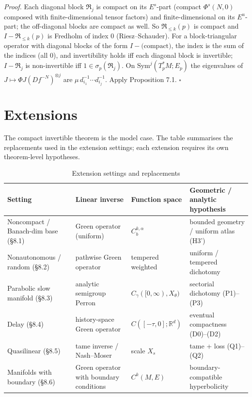 \documentclass[11pt,a4paper]{article}
\theoremstyle{plain}
\theoremstyle{definition}
\theoremstyle{remark}
\numberwithin{equation}{section}
\numberwithin{figure}{section}
\begin{document}
\textit{Proof.} Each diagonal block $\mathfrak R_j$ is compact on its $E^s$-part (compact $\Phi^s(N,0)$ composed with finite-dimensional tensor factors) and finite-dimensional on its $E^u$-part; the off-diagonal blocks are compact as well. So $\mathfrak R_{\le k}(p)$ is compact and $I-\mathfrak R_{\le k}(p)$ is Fredholm of index $0$ (Riesz–Schauder). For a block-triangular operator with diagonal blocks of the form $I-\text{(compact)}$, the index is the sum of the indices (all $0$), and invertibility holds iff each diagonal block is invertible; $I-\mathfrak R_j$ is non-invertible iff $1\in\sigma_p(\mathfrak R_j)$. On $\mathrm{Sym}^j(T^*_pM;E_p)$ the eigenvalues of $J\mapsto\Phi J(Df^{-N})^{\otimes j}$ are $\mu\,d_{i_1}^{-1}\cdots d_{i_j}^{-1}$. Apply Proposition 7.1. $\square$

\section{Extensions}

The compact invertible theorem is the model case. The table summarises the replacements used in the extension settings; each extension requires its own theorem-level hypotheses.

\begin{table}[h]
\centering
\begin{tabularx}{\textwidth}{X X X X}
\toprule
Setting & Linear inverse & Function space & Geometric / analytic hypothesis\\
\midrule
Noncompact / Banach-dim base (§8.1) & Green operator (uniform) & $C^{k,\alpha}_b$ & bounded geometry / uniform atlas (H3') \\
Nonautonomous / random (§8.2) & pathwise Green operator & tempered weighted & uniform / tempered dichotomy \\
Parabolic slow manifold (§8.3) & analytic semigroup Perron & $C_\gamma([0,\infty),X_\theta)$ & sectorial dichotomy (P1)–(P3) \\
Delay (§8.4) & history-space Green operator & $C([-\tau,0];\mathbb R^d)$ & eventual compactness (D0)–(D2) \\
Quasilinear (§8.5) & tame inverse / Nash–Moser & scale $X_s$ & tame + loss (Q1)–(Q2) \\
Manifolds with boundary (§8.6) & Green operator with boundary conditions & $C^k(M,E)$ & boundary-compatible hyperbolicity \\
\bottomrule
\end{tabularx}
\caption{Extension settings and replacements}
\label{tab:extensions}
\end{table}
\end{document}
